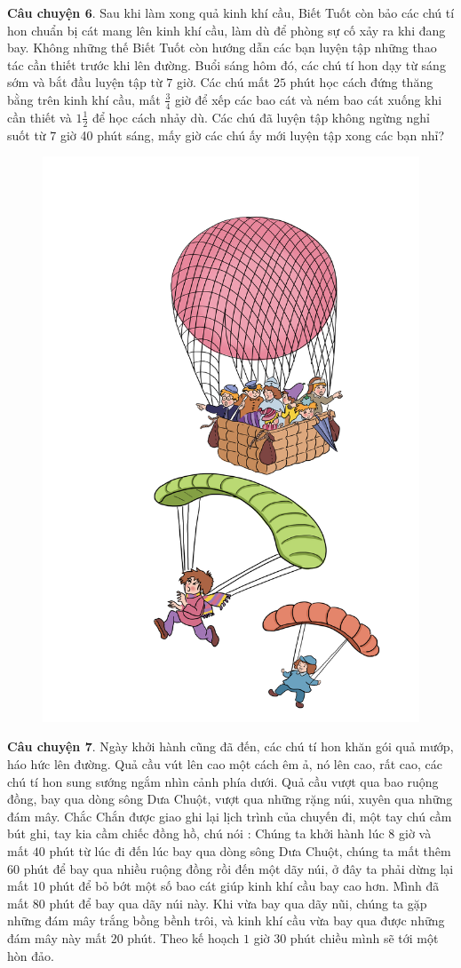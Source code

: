 	\textbf{\color{toancuabi}Câu chuyện $\pmb{6.}$} Sau khi làm xong quả kinh khí cầu, Biết Tuốt còn bảo các chú tí hon chuẩn bị cát mang lên kinh khí cầu, làm dù để phòng sự cố xảy ra khi đang bay. Không những thế Biết Tuốt còn hướng dẫn các bạn luyện tập những thao tác cần thiết trước khi lên đường. Buổi sáng hôm đó, các chú tí hon dạy từ sáng sớm và bắt đầu luyện tập từ $7$ giờ. Các chú mất $25$ phút học cách đứng thăng bằng trên kinh khí cầu, mất $\frac{3}{4}$ giờ để xếp các bao cát và ném bao cát xuống khi cần thiết và $1\frac{1}{2}$ để học cách nhảy dù. Các chú đã luyện tập không ngừng nghỉ suốt từ $7$ giờ 40 phút sáng, mấy giờ các chú ấy mới luyện tập xong các bạn nhỉ?
	\begin{figure}[H]
		\centering
		\vspace*{-5pt}
		\captionsetup{labelformat= empty, justification=centering}
		\includegraphics[width=0.5\linewidth]{Hinh9_KinhKhiCau}
		\vspace*{-10pt}
	\end{figure}
	\textbf{\color{toancuabi}Câu chuyện $\pmb{7.}$} Ngày khởi hành cũng đã đến, các chú tí hon khăn gói quả mướp, háo hức lên đường. Quả cầu vút lên cao một cách êm ả, nó lên cao, rất cao, các chú tí hon sung sướng ngắm nhìn cảnh phía dưới. Quả cầu vượt qua bao ruộng đồng, bay qua dòng sông Dưa Chuột, vượt qua những rặng núi, xuyên qua những đám mây. Chắc Chắn được giao ghi lại lịch trình của chuyến đi, một tay chú cầm bút ghi, tay kia cầm chiếc đồng hồ, chú nói : Chúng ta khởi hành lúc $8$ giờ và mất $40$ phút từ lúc đi đến lúc bay qua dòng sông Dưa Chuột, chúng ta mất thêm $60$ phút để bay qua nhiều ruộng đồng rồi đến một dãy núi, ở đây ta phải dừng lại mất $10$ phút để bỏ bớt một số bao cát giúp kinh khí cầu bay cao hơn.  Mình đã mất $80$ phút để bay qua dãy núi này. Khi vừa bay qua dãy nũi, chúng ta gặp những đám mây trắng bồng bềnh trôi, và kinh khí cầu vừa bay qua được những đám mây này mất $20$ phút. Theo kế hoạch $1$ giờ $30$ phút chiều mình sẽ tới một hòn đảo.
